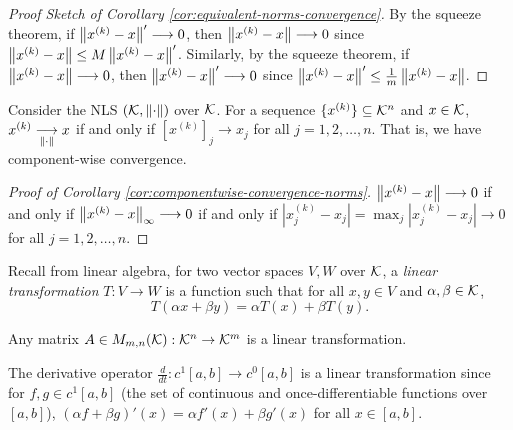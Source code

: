 \begin{proof}[Proof Sketch of Corollary \ref{cor:equivalent-norms-convergence}]
By the squeeze theorem, if $\left\lVert x^{(k)}-x\right\rVert' \longrightarrow 0$, then $\left\lVert x^{(k)}-x\right\rVert \longrightarrow 0$ since $\left\lVert x^{(k)}-x\right\rVert \leq M\left\lVert x^{(k)}-x\right\rVert'$. Similarly, by the squeeze theorem, if $\left\lVert x^{(k)}-x\right\rVert \longrightarrow 0$, then $\left\lVert x^{(k)}-x\right\rVert' \longrightarrow 0$ since $\left\lVert x^{(k)}-x\right\rVert' \leq \frac{1}{m}\left\lVert x^{(k)}-x\right\rVert$.
\end{proof}

\begin{corollary}
\label{cor:componentwise-convergence-norms}
Consider the NLS $(\mathcal{K}, \left\lVert\cdot\right\rVert)$ over $\mathcal{K}$. For a sequence $\{x^{(k)}\} \subseteq \mathcal{K}^n$ and $x \in \mathcal{K}$, $x^{(k)} \underset{\left\lVert\cdot\right\rVert}{\longrightarrow} x$ if and only if $[x^{(k)}]_j \longrightarrow x_j$ for all $j = 1,2,\dots,n$. That is, we have component-wise convergence.
\end{corollary}

\begin{proof}[Proof of Corollary \ref{cor:componentwise-convergence-norms}]
$\left\lVert x^{(k)}-x\right\rVert \longrightarrow 0$ if and only if $\left\lVert x^{(k)}-x\right\rVert_\infty \longrightarrow 0$ if and only if $|x_j^{(k)}-x_j| = \max_j |x_j^{(k)}-x_j| \longrightarrow 0$ for all $j = 1,2,\dots,n$.
\end{proof}

\begin{definition}
\label{def:linear-transformation}
Recall from linear algebra, for two vector spaces $V,W$ over $\mathcal{K}$, a \textit{linear transformation} $T:V \rightarrow W$ is a function such that for all $x,y \in V$ and $\alpha, \beta \in \mathcal{K}$,
$$
T(\alpha x + \beta y) = \alpha T(x) + \beta T(y).
$$
\end{definition}

\begin{example}
Any matrix $A \in M_{m,n}(\mathcal{K}): \mathcal{K}^n \rightarrow \mathcal{K}^m$ is a linear transformation.
\end{example}

\begin{example}
The derivative operator $\frac{d}{dt}: c^1[a,b] \rightarrow c^0[a,b]$ is a linear transformation since for $f,g \in c^1[a,b]$ (the set of continuous and once-differentiable functions over $[a,b]$), $(\alpha f + \beta g)'(x) = \alpha f'(x) + \beta g'(x)$ for all $x \in [a,b]$.
\end{example}

